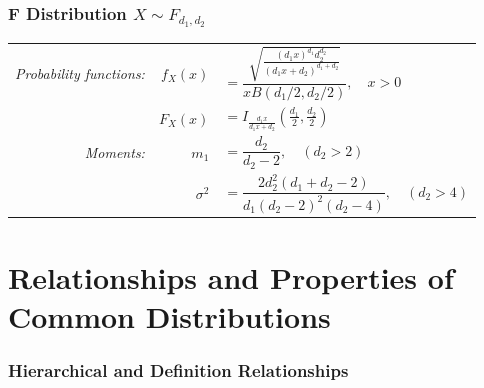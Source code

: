 \documentclass[11pt,a4paper]{article}
\theoremstyle{definition}
\begin{document}
\subsubsection*{F Distribution $X \sim F_{d_1,d_2}$}
\begin{longtable}{r r l}
\textit{Probability functions:} & $f_X(x)$ & $=\dfrac{\sqrt{\frac{(d_1x)^{d_1}d_2^{d_2}}{(d_1x+d_2)^{d_1+d_2}}}}{xB(d_1/2,d_2/2)}, \quad x>0$ \vspace{0.2cm}\\
& $F_X(x)$ & $=I_{\frac{d_1x}{d_1x+d_2}}\!\left(\frac{d_1}{2},\frac{d_2}{2}\right)$\vspace{0.2cm}\\
\textit{Moments:} & $m_1$ & $=\dfrac{d_2}{d_2-2}, \quad (d_2>2)$ \vspace{0.2cm}\\
& $\sigma^2$ & $=\dfrac{2d_2^2(d_1+d_2-2)}{d_1(d_2-2)^2(d_2-4)}, \quad (d_2>4)$\\

\end{longtable}

\newpage
\section{Relationships and Properties of Common Distributions}

\subsubsection*{Hierarchical and Definition Relationships}
\end{document}
